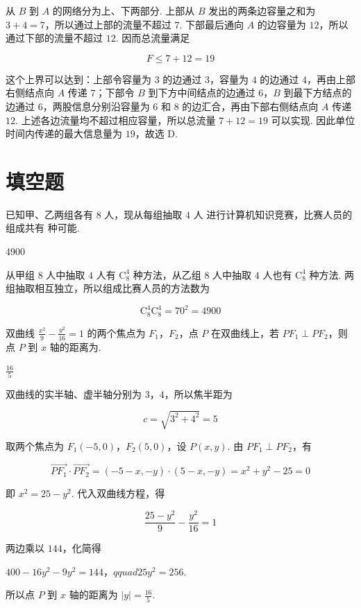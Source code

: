 \begin{solution}
从 \(B\) 到 \(A\) 的网络分为上、下两部分. 上部从 \(B\) 发出的两条边容量之和为 \(3+4=7\)，所以通过上部的流量不超过 \(7\). 下部最后通向 \(A\) 的边容量为 \(12\)，所以通过下部的流量不超过 \(12\). 因而总流量满足

\[
F\leqslant7+12=19
\]

这个上界可以达到：上部令容量为 \(3\) 的边通过 \(3\)，容量为 \(4\) 的边通过 \(4\)，再由上部右侧结点向 \(A\) 传递 \(7\)；下部令 \(B\) 到下方中间结点的边通过 \(6\)，\(B\) 到最下方结点的边通过 \(6\)，两股信息分别沿容量为 \(6\) 和 \(8\) 的边汇合，再由下部右侧结点向 \(A\) 传递 \(12\). 上述各边流量均不超过相应容量，所以总流量 \(7+12=19\) 可以实现. 因此单位时间内传递的最大信息量为 \(19\)，故选 D.
\end{solution}

\section{填空题}
\begin{problem}
已知甲、乙两组各有 \(8\text{ 人}\)，现从每组抽取 \(4\text{ 人}\) 进行计算机知识竞赛，比赛人员的组成共有\fillinblank{} 种可能.
\end{problem}

\begin{answer}
4900
\end{answer}

\begin{solution}
从甲组 \(8\) 人中抽取 \(4\) 人有 \(\mathrm C_8^4\) 种方法，从乙组 \(8\) 人中抽取 \(4\) 人也有 \(\mathrm C_8^4\) 种方法. 两组抽取相互独立，所以组成比赛人员的方法数为

\[
\mathrm C_8^4\mathrm C_8^4=70^2=4900
\]
\end{solution}

\begin{problem}
双曲线 \(\frac{x^{2}}{9} - \frac{y^{2}}{16} = 1\) 的两个焦点为 \(F_{1}\)，\(F_{2}\)，点 \(P\) 在双曲线上，若 \(PF_{1} \perp PF_{2}\)，则点 \(P\) 到 \(x\) 轴的距离为\fillinblank{}.
\end{problem}

\begin{answer}
\(\frac{16}{5}\)
\end{answer}

\begin{solution}
双曲线的实半轴、虚半轴分别为 \(3\)，\(4\)，所以焦半距为

\[
c=\sqrt{3^2+4^2}=5
\]

取两个焦点为 \(F_1(-5,0)\)，\(F_2(5,0)\)，设 \(P(x,y)\). 由 \(PF_1\perp PF_2\)，有

\[
\overrightarrow{PF_1}\cdot\overrightarrow{PF_2}=(-5-x,-y)\cdot(5-x,-y)=x^2+y^2-25=0
\]

即 \(x^2=25-y^2\). 代入双曲线方程，得

\[
\frac{25-y^2}{9}-\frac{y^2}{16}=1
\]

两边乘以 \(144\)，化简得

\(400-16y^2-9y^2=144\)，\(qquad 25y^2=256\).

所以点 \(P\) 到 \(x\) 轴的距离为 \(|y|=\frac{16}{5}\).
\end{solution}


